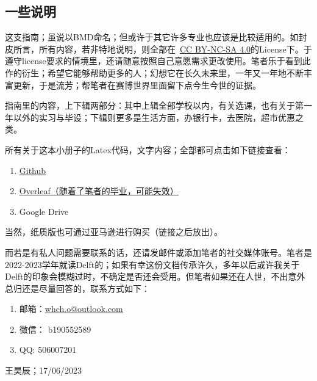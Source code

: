 \subsection{一些说明}
这支指南；虽说以BMD命名；但或许于其它许多专业也应该是比较适用的。如封皮所言，所有内容，若非特地说明，则全部在\ccbyncsa\ \href{http://creativecommons.org/licenses/by-nc-sa/4.0/}{\uline{CC BY-NC-SA 4.0}}的License下。于遵守license要求的情境里，还请随意按照自己意愿需求更改使用。笔者乐于看到此作的衍生；希望它能够帮助更多的人；幻想它在长久未来里，一年又一年地不断丰富更新，于是流芳；帮笔者在赛博世界里面留下点今生今世的证据。

指南里的内容，上下辑两部分：其中上辑全部学校以内，有关选课，也有关于第一年以外的实习与毕设；下辑则更多是生活方面，办银行卡，去医院，超市优惠之类。

所有关于这本小册子的Latex代码，文字内容；全部都可点击如下链接查看：
\begin{enumerate}
\item \href{https://github.com/HochanWang/BMD-ZhiNan}{\uline{Github}}
\item \href{https://www.overleaf.com/9181971742xyhrjrdxdzkt}{\uline{Overleaf（随着了笔者的毕业，可能失效）}}
\item Google Drive
\end{enumerate}

当然，纸质版也可通过亚马逊进行购买（链接之后放出）。

而若是有私人问题需要联系的话，还请发邮件或添加笔者的社交媒体账号。笔者是2022-2023学年就读Delft的；如果有幸这份文档传承许久，多年以后或许我关于Delft的印象会模糊过时，不确定是否还会受用。但笔者如果还在人世，不出意外总归还是尽量回答的，联系方式如下：
\begin{enumerate}
\item 邮箱：\href{mailto:whch.o@outlook.com}{whch.o@outlook.com}
\item 微信： b190552589
\item QQ: 506007201
\end{enumerate}

\begin{flushright}
王昊辰；17/06/2023
\end{flushright}
